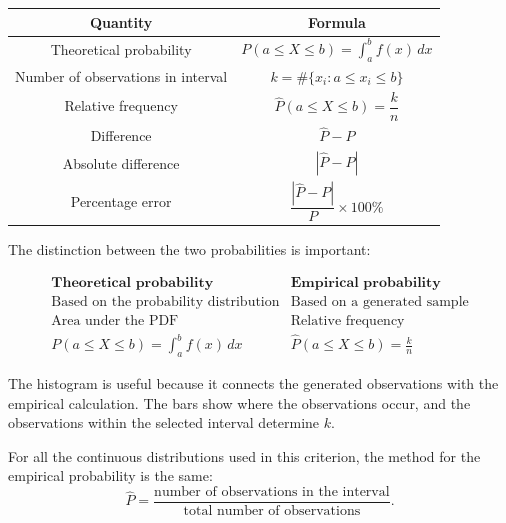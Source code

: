\begin{center}
	\renewcommand{\arraystretch}{1.7}
	\begin{tabular}{|c|c|}
		\hline
		\textbf{Quantity} & \textbf{Formula} \\
		\hline
		
		Theoretical probability
		&
		$P(a\leq X\leq b)
		=
		\displaystyle\int_a^b f(x)\,dx$
		\\
		\hline
		
		Number of observations in interval
		&
		$k=\#\{x_i:a\leq x_i\leq b\}$
		\\
		\hline
		
		Relative frequency
		&
		$\widehat{P}(a\leq X\leq b)=\dfrac{k}{n}$
		\\
		\hline
		
		Difference
		&
		$\widehat{P}-P$
		\\
		\hline
		
		Absolute difference
		&
		$|\widehat{P}-P|$
		\\
		\hline
		
		Percentage error
		&
		$\dfrac{|\widehat{P}-P|}{P}\times100\%$
		\\
		\hline
	\end{tabular}
\end{center}

The distinction between the two probabilities is important:

\[
\boxed{
	\begin{array}{c|c}
		\textbf{Theoretical probability} & \textbf{Empirical probability} \\ \hline
		\text{Based on the probability distribution}
		&
		\text{Based on a generated sample}
		\\[1mm]
		\text{Area under the PDF}
		&
		\text{Relative frequency}
		\\[1mm]
		\displaystyle
		P(a\leq X\leq b)
		=
		\int_a^b f(x)\,dx
		&
		\displaystyle
		\widehat{P}(a\leq X\leq b)
		=
		\frac{k}{n}
\end{array}}
\]

The histogram is useful because it connects the generated observations with
the empirical calculation. The bars show where the observations occur, and
the observations within the selected interval determine $k$.

For all the continuous distributions used in this criterion, the method for
the empirical probability is the same:
\[
\widehat{P}
=
\frac{\text{number of observations in the interval}}
{\text{total number of observations}}.
\]


